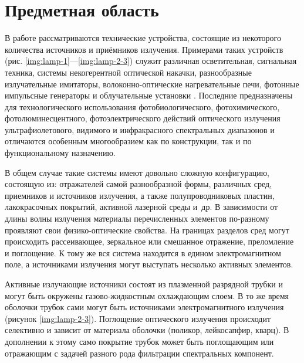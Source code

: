 \section{Предметная область}

В работе рассматриваются технические устройства, состоящие из некоторого количества источников и приёмников излучения.
Примерами таких устройств (рис. \ref{img:lamp-1}—\ref{img:lamp-2-3}) служит различная осветительная, сигнальная техника, системы некогерентной оптической накачки, разнообразные излучательные имитаторы, волоконно-оптические нагревательные печи, фотонные импульсные генераторы и облучательные установки \cite{lighting-engineering, lasers, neodymium-glass-lasers, sarychev}.
Последние предназначены для технологического использования фотобиологического, фотохимического, фотолюминесцентного, фотоэлектрического действий оптического излучения ультрафиолетового, видимого и инфракрасного спектральных диапазонов и отличаются особенным многообразием как по конструкции, так и по функциональному назначению.

В общем случае такие системы имеют довольно сложную конфигурацию, состоящую из:
отражателей самой разнообразной формы, различных сред, приемников и источников излучения, а также полупроводниковых пластин, лакокрасочных покрытий, активной лазерной среды и~др.
В зависимости от длины волны излучения материалы перечисленных элементов по-разному проявляют свои физико-оптические свойства.
На границах разделов сред могут происходить рассеивающее, зеркальное или смешанное отражение, преломление и поглощение.
К тому же вся система находится в едином электромагнитном поле, а источниками излучения могут выступать несколько активных элементов.

Активные излучающие источники состоят из плазменной разрядной трубки и могут быть окружены газово-жидкостным охлаждающим слоем.
В то же время оболочки трубок сами могут быть источниками электромагнитного излучения (рисунок \ref{img:lamp-2-3}).
Поглощение оптического излучения происходит селективно и зависит от материала оболочки (поликор, лейкосапфир, кварц).
В дополнении к этому само покрытие трубок может быть поглощающим или отражающим с задачей разного рода фильтрации спектральных компонент.



